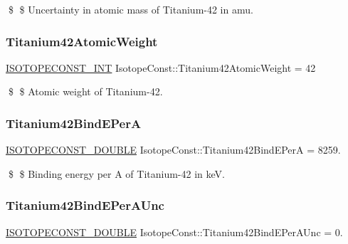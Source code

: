 \$ \$ Uncertainty in atomic mass of Titanium-\/42 in amu. \mbox{\label{group___isotope_const-_titanium-_ti42_ga7730111b778d1e9cf87dbdc23aae8c37}} 
\subsubsection{\texorpdfstring{Titanium42\+Atomic\+Weight}{Titanium42AtomicWeight}}
{\footnotesize\ttfamily \mbox{\hyperlink{group___isotope_const-_macros_ga5f18360b3e99483a35c32d789e62621c}{I\+S\+O\+T\+O\+P\+E\+C\+O\+N\+S\+T\+\_\+\+I\+NT}} Isotope\+Const\+::\+Titanium42\+Atomic\+Weight = 42}

\$ \$ Atomic weight of Titanium-\/42. \mbox{\label{group___isotope_const-_titanium-_ti42_ga32d492fbf45f11d641767134fdb5e7c3}} 
\subsubsection{\texorpdfstring{Titanium42\+Bind\+E\+PerA}{Titanium42BindEPerA}}
{\footnotesize\ttfamily \mbox{\hyperlink{group___isotope_const-_macros_ga8f45a7272ce02c0b4c65c44636ed719a}{I\+S\+O\+T\+O\+P\+E\+C\+O\+N\+S\+T\+\_\+\+D\+O\+U\+B\+LE}} Isotope\+Const\+::\+Titanium42\+Bind\+E\+PerA = 8259.}

\$ \$ Binding energy per A of Titanium-\/42 in keV. \mbox{\label{group___isotope_const-_titanium-_ti42_ga770acaf172c6bc3d6af5cca698ff98b2}} 
\subsubsection{\texorpdfstring{Titanium42\+Bind\+E\+Per\+A\+Unc}{Titanium42BindEPerAUnc}}
{\footnotesize\ttfamily \mbox{\hyperlink{group___isotope_const-_macros_ga8f45a7272ce02c0b4c65c44636ed719a}{I\+S\+O\+T\+O\+P\+E\+C\+O\+N\+S\+T\+\_\+\+D\+O\+U\+B\+LE}} Isotope\+Const\+::\+Titanium42\+Bind\+E\+Per\+A\+Unc = 0.}

